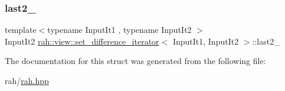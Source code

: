 \mbox{\label{structrah_1_1view_1_1set__difference__iterator_aec1d3823ab15bd54cffcdf4980ef5595}} 
\subsubsection{\texorpdfstring{last2\_}{last2\_}}
{\footnotesize\ttfamily template$<$typename Input\+It1 , typename Input\+It2 $>$ \\
Input\+It2 \mbox{\hyperlink{structrah_1_1view_1_1set__difference__iterator}{rah\+::view\+::set\+\_\+difference\+\_\+iterator}}$<$ Input\+It1, Input\+It2 $>$\+::last2\+\_\+}



The documentation for this struct was generated from the following file\+:\begin{DoxyCompactItemize}
\item 
rah/\mbox{\hyperlink{rah_8hpp}{rah.\+hpp}}\end{DoxyCompactItemize}
